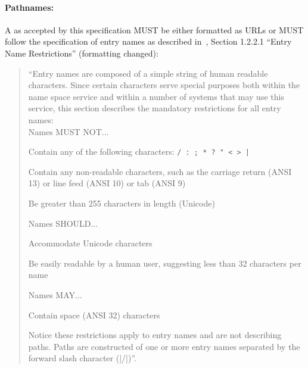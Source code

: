    \paragraph{Pathnames:}
 
     A  as accepted by this specification MUST be
     either formatted as URLs or MUST follow the specification
     of entry names as described
     in~\cite{rns}, Section 1.2.2.1 ``Entry Name Restrictions''
     (formatting changed):
 
     \begin{quote}
 
       \small \it
 
      ``Entry names are composed of a simple string of human
      readable characters. Since certain characters serve
      special purposes both within the name space service and
      within a number of systems that may use this service, this
      section describes the mandatory restrictions for all entry
      names:\\
 
      Names MUST NOT...

        \begin{shortlist}
         \item Contain any of the following characters: 
               \verb'/ : ; * ? " < > |'
         \item Contain any non-readable characters, such as the
               carriage return (ANSI 13) or line feed (ANSI 10) 
               or tab (ANSI 9)
         \item Be greater than 255 characters in length
               (Unicode)\\
        \end{shortlist}
 
       Names SHOULD...
          
        \begin{shortlist}
         \item Accommodate Unicode characters
         \item Be easily readable by a human user, suggesting 
               less than 32 characters per name\\
        \end{shortlist}
 
      Names MAY...
 
        \begin{shortlist}
         \item Contain space (ANSI 32) characters\\
        \end{shortlist}
 
      Notice these restrictions apply to entry names and are not
      describing paths. Paths are constructed of one or more
      entry names separated by the forward slash character (|/|)''.
 
     \end{quote}
 
